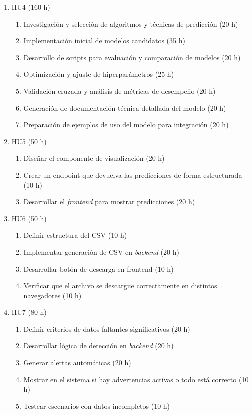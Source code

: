 \documentclass[
11pt, %
]{charter}
\begin{document}
\begin{enumerate}
\item HU4 (160 h)
\begin{enumerate}
	\item Investigación y selección de algoritmos y técnicas de predicción (20 h)
	\item Implementación inicial de modelos candidatos (35 h)
	\item Desarrollo de scripts para evaluación y comparación de modelos (20 h)
	\item Optimización y ajuste de hiperparámetros (25 h)
	\item Validación cruzada y análisis de métricas de desempeño (20 h)
	\item Generación de documentación técnica detallada del modelo (20 h)
	\item Preparación de ejemplos de uso del modelo para integración (20 h)
\end{enumerate}


\item HU5 (50 h)
\begin{enumerate}
	\item Diseñar el componente de visualización (20 h)
	\item Crear un endpoint que devuelva las predicciones de forma estructurada (10 h)
	\item Desarrollar el \textit{frontend} para mostrar predicciones (20 h)
\end{enumerate}


\item HU6 (50 h)
\begin{enumerate}
	\item Definir estructura del CSV (10 h)
	\item Implementar generación de CSV en \textit{backend} (20 h)
	\item Desarrollar botón de descarga en frontend (10 h)
	\item Verificar que el archivo se descargue correctamente en distintos navegadores (10 h)
\end{enumerate}


\item HU7 (80 h)
\begin{enumerate}
	\item Definir criterios de datos faltantes significativos (20 h)
	\item Desarrollar lógica de detección en \textit{backend} (20 h)
	\item Generar alertas automáticas (20 h)
	\item Mostrar en el sistema si hay advertencias activas o todo está correcto (10 h)
	\item Testear escenarios con datos incompletos (10 h)
\end{enumerate}



\end{enumerate}
\end{document}
